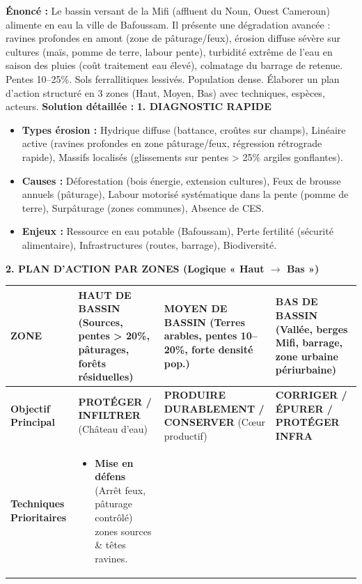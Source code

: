 \documentclass[11pt]{article}
\begin{document}
\begin{exoresolu}
    \textbf{Énoncé :} Le bassin versant de la Mifi (affluent du Noun, Ouest Cameroun) alimente en eau la ville de Bafoussam. Il présente une dégradation avancée : ravines profondes en amont (zone de pâturage/feux), érosion diffuse sévère sur cultures (maïs, pomme de terre, labour pente), turbidité extrême de l'eau en saison des pluies (coût traitement eau élevé), colmatage du barrage de retenue. Pentes 10–25\%. Sols ferrallitiques lessivés. Population dense. Élaborer un plan d'action structuré en 3 zones (Haut, Moyen, Bas) avec techniques, espèces, acteurs.
    \tcblower
    \textbf{Solution détaillée :}
    \textbf{1. DIAGNOSTIC RAPIDE}
    \begin{itemize}
        \item \textbf{Types érosion :} Hydrique diffuse (battance, croûtes sur champs), Linéaire active (ravines profondes en zone pâturage/feux, régression rétrograde rapide), Massifs localisés (glissements sur pentes > 25\% argiles gonflantes).
        \item \textbf{Causes :} Déforestation (bois énergie, extension cultures), Feux de brousse annuels (pâturage), Labour motorisé systématique dans la pente (pomme de terre), Surpâturage (zones communes), Absence de CES.
        \item \textbf{Enjeux :} Ressource en eau potable (Bafoussam), Perte fertilité (sécurité alimentaire), Infrastructures (routes, barrage), Biodiversité.
    \end{itemize}
    \textbf{2. PLAN D'ACTION PAR ZONES (Logique « Haut $\rightarrow$ Bas »)}
    \begin{center}
    \begin{tabularx}{\linewidth}{|l|X|X|X|}\hline
    \rowcolor{popblueL}
    \textbf{ZONE} & \textbf{HAUT DE BASSIN (Sources, pentes > 20\%, pâturages, forêts résiduelles)} & \textbf{MOYEN DE BASSIN (Terres arables, pentes 10–20\%, forte densité pop.)} & \textbf{BAS DE BASSIN (Vallée, berges Mifi, barrage, zone urbaine périurbaine)} \\ \hline
    \textbf{Objectif Principal} & \textbf{PROTÉGER / INFILTRER} (Château d'eau) & \textbf{PRODUIRE DURABLEMENT / CONSERVER} (Cœur productif) & \textbf{CORRIGER / ÉPURER / PROTÉGER INFRA} \\ \hline
    \textbf{Techniques Prioritaires} &
    \begin{itemize}
        \item \textbf{Mise en défens} (Arrêt feux, pâturage contrôlé) zones sources \& têtes ravines.

\end{itemize}
\end{tabularx}
\end{center}
\end{exoresolu}
\end{document}
